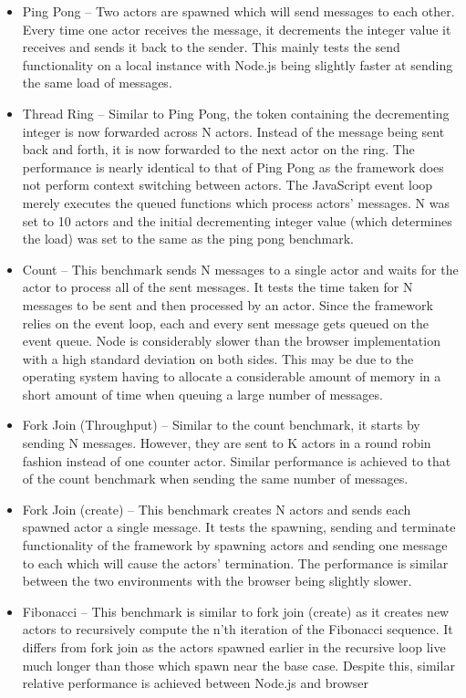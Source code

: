 \documentclass[oneside]{um-fict}
\begin{document}
\begin{itemize}
    \item Ping Pong – Two actors are spawned which will send messages to each other. Every time one actor receives the message, it decrements the integer value it receives and sends it back to the sender. This mainly tests the send functionality on a local instance with Node.js being slightly faster at sending the same load of messages.
    \item Thread Ring – Similar to Ping Pong, the token containing the decrementing integer is now forwarded across N actors. Instead of the message being sent back and forth, it is now forwarded to the next actor on the ring. The performance is nearly identical to that of Ping Pong as the framework does not perform context switching between actors. The JavaScript event loop merely executes the queued functions which process actors' messages. N was set to 10 actors and the initial decrementing integer value (which determines the load) was set to the same as the ping pong benchmark.
    \item Count – This benchmark sends N messages to a single actor and waits for the actor to process all of the sent messages. It tests the time taken for N messages to be sent and then processed by an actor. Since the framework relies on the event loop, each and every sent message gets queued on the event queue. Node is considerably slower than the browser implementation with a high standard deviation on both sides. This may be due to the operating system having to allocate a considerable amount of memory in a short amount of time when queuing a large number of messages.
    \item Fork Join (Throughput) – Similar to the count benchmark, it starts by sending N messages. However, they are sent to K actors in a round robin fashion instead of one counter actor. Similar performance is achieved to that of the count benchmark when sending the same number of messages.
    \item Fork Join (create) – This benchmark creates N actors and sends each spawned actor a single message. It tests the spawning, sending and terminate functionality of the framework by spawning actors and sending one message to each which will cause the actors' termination. The performance is similar between the two environments with the browser being slightly slower.
    \item Fibonacci – This benchmark is similar to fork join (create) as it creates new actors to recursively compute the n'th iteration of the Fibonacci sequence. It differs from fork join as the actors spawned earlier in the recursive loop live much longer than those which spawn near the base case. Despite this, similar relative performance is achieved between Node.js and browser

\end{itemize}
\end{document}
